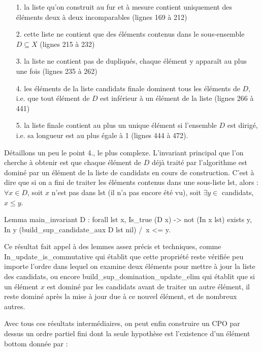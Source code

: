 \documentclass{article}
\newcommand\code[1]{{\fontfamily{lmtt}\selectfont #1}}
\theoremstyle{definition}
\begin{document}
\begin{itemize}
\item[1.] la liste qu'on construit au fur et à mesure contient uniquement des éléments deux à deux incomparables (lignes 169 à 212)
\item[2.] cette liste ne contient que des éléments contenus dans le sous-ensemble $D \subseteq X$ (lignes 215 à 232)
\item[3.] la liste ne contient pas de dupliqués, chaque élément y apparaît au plus une fois (lignes 235 à 262)
\item[4.] les éléments de la liste \code{candidats} finale dominent tous les éléments de $D$, i.e. que tout élément de $D$ est inférieur à un élément de la liste (lignes 266 à 441)
\item[5.] la liste finale contient au plus un unique élément si l'ensemble $D$ est dirigé, i.e. sa longueur est au plus égale à 1 (lignes 444 à 472).
\end{itemize}


Détaillons un peu le point 4., le plus complexe. L'invariant principal que l'on cherche à obtenir est que chaque élément de $D$ déjà traité par l'algorithme est dominé par un élément de la liste de candidats en cours de construction. C'est à dire que si on a fini de traiter les éléments contenus dans une sous-liste \code{lst}, alors : $\forall x \in D$, soit $x$ n'est pas dans \code{lst} (il n'a pas encore été vu), soit $\exists y \in$ \code{candidats}, $x \leq y$.


\begin{coq}
Lemma main_invariant D : forall lst x, Is_true (D x) -> not (In x lst)
    \/ exists y, In y (build_sup_candidate_aux D lst nil) /\ x <= y.
\end{coq}

Ce résultat fait appel à des lemmes assez précis et techniques, comme \code{In\_update\_is\_commutative} qui établit que cette propriété reste vérifiée peu importe l'ordre dans lequel on examine deux éléments pour mettre à jour la liste des \code{candidats}, ou encore \code{build\_sup\_domination\_update\_elim} qui établit que si un élément $x$ est dominé par les \code{candidats} avant de traiter un autre élément, il reste dominé après la mise à jour due à ce nouvel élément, et de nombreux autres.

Avec tous ces résultats intermédiaires, on peut enfin construire un CPO par dessus un ordre partiel fini dont la seule hypothèse est l'existence d'un élément bottom donnée par :
\end{document}
